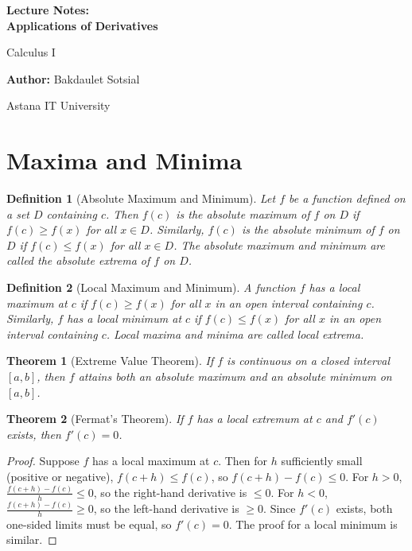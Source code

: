 \documentclass[11pt,a4paper]{article}
\newtheorem{theorem}{Theorem}
\newtheorem{definition}{Definition}
\begin{document}
\begin{titlepage}
\centering
\vspace*{4cm}
{\Huge\bfseries Lecture Notes:\\ Applications of Derivatives\par}
\vspace{1cm}
{\Large Calculus I\par}
\vspace{2cm}
{\large \textbf{Author:} Bakdaulet Sotsial\par}
\vspace{1cm}
\vfill
{\small Astana IT University \par}
\vspace*{2cm}
\end{titlepage}
\tableofcontents
\newpage
\section{Maxima and Minima}
\begin{definition}[Absolute Maximum and Minimum]
Let $f$ be a function defined on a set $D$ containing $c$. Then $f(c)$ is the \textit{absolute maximum} of $f$ on $D$ if $f(c) \geq f(x)$ for all $x \in D$. Similarly, $f(c)$ is the \textit{absolute minimum} of $f$ on $D$ if $f(c) \leq f(x)$ for all $x \in D$. The absolute maximum and minimum are called the \textit{absolute extrema} of $f$ on $D$.
\end{definition}
\begin{definition}[Local Maximum and Minimum]
A function $f$ has a \textit{local maximum} at $c$ if $f(c) \geq f(x)$ for all $x$ in an open interval containing $c$. Similarly, $f$ has a \textit{local minimum} at $c$ if $f(c) \leq f(x)$ for all $x$ in an open interval containing $c$. Local maxima and minima are called \textit{local extrema}.
\end{definition}
\begin{theorem}[Extreme Value Theorem]
If $f$ is continuous on a closed interval $[a, b]$, then $f$ attains both an absolute maximum and an absolute minimum on $[a, b]$.
\end{theorem}
\begin{theorem}[Fermat's Theorem]
If $f$ has a local extremum at $c$ and $f'(c)$ exists, then $f'(c) = 0$.
\end{theorem}
\begin{proof}
Suppose $f$ has a local maximum at $c$. Then for $h$ sufficiently small (positive or negative), $f(c+h) \leq f(c)$, so $f(c+h) - f(c) \leq 0$. For $h > 0$, $\frac{f(c+h) - f(c)}{h} \leq 0$, so the right-hand derivative is $\leq 0$. For $h < 0$, $\frac{f(c+h) - f(c)}{h} \geq 0$, so the left-hand derivative is $\geq 0$. Since $f'(c)$ exists, both one-sided limits must be equal, so $f'(c) = 0$. The proof for a local minimum is similar.
\end{proof}
\end{document}
